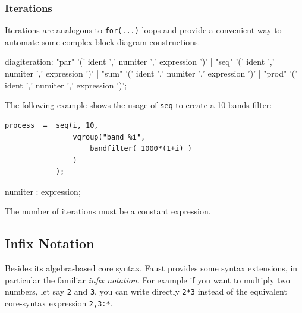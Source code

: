 \subsubsection{Iterations} 
Iterations are analogous to \lstinline'for(...)' loops and provide a convenient way to automate some complex block-diagram constructions. 


\begin{rail}
diagiteration: "par" '(' ident ',' numiter ',' expression ')'
           | "seq" '(' ident ',' numiter ',' expression ')'
           | "sum" '(' ident ',' numiter ',' expression ')'
           | "prod" '(' ident ',' numiter ',' expression ')';
\end{rail}

The following example shows the usage of  \lstinline'seq' to create a 10-bands filter:

\begin{lstlisting}
process  =	seq(i, 10, 
				vgroup("band %i", 
					bandfilter( 1000*(1+i) ) 
				) 
			);
\end{lstlisting}

\begin{rail}
numiter : expression;
\end{rail}
The number of iterations must be a constant expression. 

\subsection{Infix Notation}

Besides its algebra-based core syntax, Faust provides some syntax extensions, in particular the familiar \emph{infix notation}. For example if you want to multiply two numbers, let say \lstinline'2' and \lstinline'3', you can write directly \lstinline'2*3' instead of the equivalent core-syntax expression \lstinline'2,3:*'.

